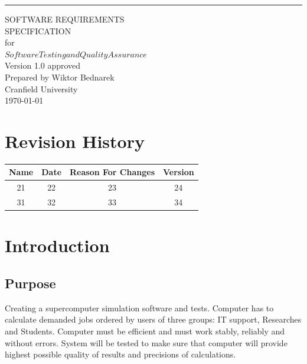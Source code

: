 \documentclass{scrreprt}
\date{}
\def\myversion{1.0 }
\begin{document}
\begin{flushright}
    \rule{16cm}{5pt}\vskip1cm
    \begin{bfseries}
        \Huge{SOFTWARE REQUIREMENTS\\ SPECIFICATION}\\
        \vspace{1.9cm}
        for\\
        \vspace{1.9cm}
        $ Software Testing and Quality Assurance $\\
        \vspace{1.9cm}
        \LARGE{Version \myversion approved}\\
        \vspace{1.9cm}
        Prepared by Wiktor Bednarek\\
        \vspace{1.9cm}
        Cranfield University\\
        \vspace{1.9cm}
        \today\\
    \end{bfseries}
\end{flushright}

\tableofcontents


\chapter*{Revision History}

\begin{center}
    \begin{tabular}{|c|c|c|c|}
        \hline
	    Name & Date & Reason For Changes & Version\\
        \hline
	    21 & 22 & 23 & 24\\
        \hline
	    31 & 32 & 33 & 34\\
        \hline
    \end{tabular}
\end{center}

\chapter{Introduction}

\section{Purpose}
Creating a supercomputer simulation software and tests. Computer has to calculate demanded jobs ordered by users of three groups: IT support, Researches and Students. Computer must be efficient and must work stably, reliably and without errors. System will be tested to make sure that computer will provide highest possible quality of results and precisions of calculations.
\end{document}
